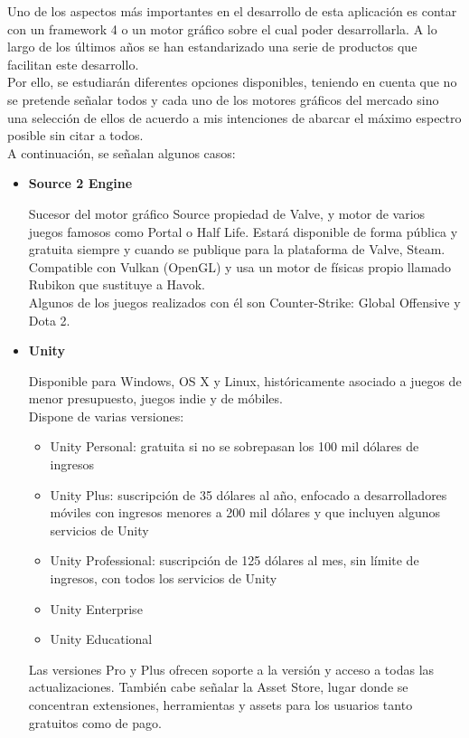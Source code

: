 \quad Uno de los aspectos más importantes en el desarrollo de esta aplicación es contar con un framework 4 o un motor gráfico sobre el cual poder desarrollarla. A lo largo de
los últimos años se han estandarizado una serie de productos que facilitan este desarrollo.\\

\quad Por ello, se estudiarán diferentes opciones disponibles, teniendo en cuenta que no se pretende señalar todos y cada uno de los motores gráficos del mercado sino una
selección de ellos de acuerdo a mis intenciones de abarcar el máximo espectro posible sin citar a todos.\\

\quad A continuación, se señalan algunos casos:

\begin{itemize}
\item{\textbf{Source 2 Engine}}

\quad Sucesor del motor gráfico Source propiedad de Valve, y motor de varios juegos famosos como Portal o Half Life. Estará disponible de forma pública y gratuita siempre y cuando se publique para la plataforma de Valve, Steam. Compatible con Vulkan (OpenGL) y usa un motor de físicas propio llamado Rubikon que sustituye a Havok. \\

\quad Algunos de los juegos realizados con él son Counter-Strike: Global Offensive y Dota 2.\\ 

\item{\textbf{Unity}} 

\quad Disponible para Windows, OS X y Linux, históricamente asociado a juegos de menor presupuesto, juegos indie y de móbiles.\\ 

\quad Dispone de varias versiones: 
\begin{itemize}
	\item Unity Personal: gratuita si no se sobrepasan los 100 mil dólares de ingresos
	\item Unity Plus: suscripción de 35 dólares al año, enfocado a desarrolladores móviles con ingresos menores a 200 mil dólares y que incluyen algunos servicios de Unity
	\item Unity Professional: suscripción de 125 dólares al mes, sin límite de ingresos, con todos los servicios de Unity
	\item Unity Enterprise
	\item Unity Educational 
\end{itemize}
\quad Las versiones Pro y Plus ofrecen soporte a la versión y acceso a todas las actualizaciones. También cabe señalar la Asset Store, lugar donde se concentran extensiones, herramientas y assets para los usuarios tanto gratuitos como de pago.\\


\end{itemize}
